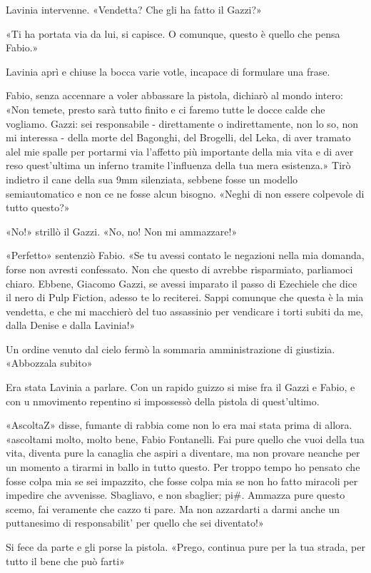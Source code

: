 Lavinia intervenne. «Vendetta? Che gli ha fatto il Gazzi?»

«Ti ha portata via da lui, si capisce. O comunque, questo è quello che pensa Fabio.» 

Lavinia aprì e chiuse la bocca varie votle, incapace di formulare una frase.

Fabio, senza accennare a voler abbassare la pistola, dichiarò al mondo intero: «Non temete, presto sarà tutto finito e ci faremo tutte le docce calde che vogliamo. Gazzi: sei responsabile - direttamente o indirettamente, non lo so, non mi interessa - della morte del Bagonghi, del Brogelli, del Leka, di aver tramato alel mie spalle per portarmi via l'affetto più importante della mia vita e di aver reso quest'ultima un inferno tramite l'influenza della tua mera esistenza.» Tirò indietro il cane della sua 9mm silenziata, sebbene fosse un modello semiautomatico e non ce ne fosse alcun bisogno. «Neghi di non essere colpevole di tutto questo?»

«No!» strillò il Gazzi. «No, no! Non mi ammazzare!»

«Perfetto» sentenziò Fabio. «Se tu avessi contato le negazioni nella mia domanda, forse non avresti confessato. Non che questo di avrebbe risparmiato, parliamoci chiaro. Ebbene, Giacomo Gazzi, se avessi imparato il passo di Ezechiele che dice il nero di Pulp Fiction, adesso te lo reciterei. Sappi comunque che questa è la mia vendetta, e che mi macchierò del tuo assassinio per vendicare i torti subiti da me, dalla Denise e dalla Lavinia!»

Un ordine venuto dal cielo fermò la sommaria amministrazione di giustizia. «Abbozzala subito»

Era stata Lavinia a parlare. Con un rapido guizzo si mise fra il Gazzi e Fabio, e con u nmovimento repentino si impossessò della pistola di quest'ultimo.

«AscoltaZ» disse, fumante di rabbia come non lo era mai stata prima di allora. «ascoltami molto, molto bene, Fabio Fontanelli. Fai pure quello che vuoi della tua vita, diventa pure la canaglia che aspiri a diventare, ma non provare neanche per un momento a tirarmi in ballo in tutto questo. Per troppo tempo ho pensato che fosse colpa mia se sei impazzito, che fosse colpa mia se non ho fatto miracoli per impedire che avvenisse. Sbagliavo, e non sbaglier; pi#. Ammazza pure questo scemo, fai veramente che cazzo ti pare. Ma non azzardarti a darmi anche un puttanesimo di responsabilit' per quello che sei diventato!»

Si fece da parte e gli porse la pistola. «Prego, continua pure per la tua strada, per tutto il bene che può farti»

